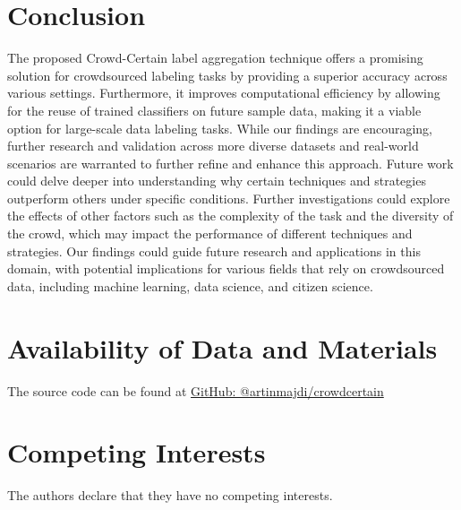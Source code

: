 \documentclass[sn-nature]{bst/sn-jnl}
\begin{document}
\section{Conclusion}\label{sec:crowd.conclusion}
The proposed Crowd-Certain label aggregation technique offers a promising solution for crowdsourced labeling tasks by providing a superior accuracy across various settings. Furthermore, it improves computational efficiency by allowing for the reuse of trained classifiers on future sample data, making it a viable option for large-scale data labeling tasks. While our findings are encouraging, further research and validation across more diverse datasets and real-world scenarios are warranted to further refine and enhance this approach. Future work could delve deeper into understanding why certain techniques and strategies outperform others under specific conditions. Further investigations could explore the effects of other factors such as the complexity of the task and the diversity of the crowd, which may impact the performance of different techniques and strategies. Our findings could guide future research and applications in this domain, with potential implications for various fields that rely on crowdsourced data, including machine learning, data science, and citizen science.
\section{Availability of Data and Materials}
The source code can be found at \href{https://github.com/artinmajdi/crowdcertain}{GitHub: @artinmajdi/crowdcertain}
\section*{Competing Interests}
The authors declare that they have no competing interests.

% 

\end{document}
